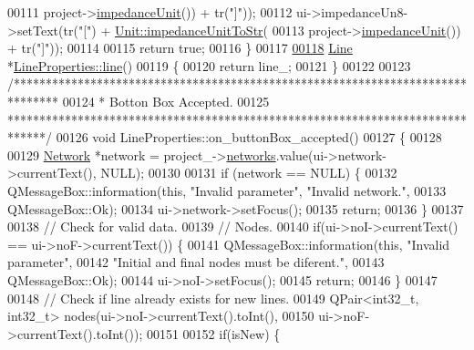 \begin{DoxyCode}
00111                               project->\hyperlink{class_project_ad0725b9aa4445dd6d21d4e15df482d3b}{impedanceUnit}()) + tr(\textcolor{stringliteral}{"]"}));
00112   ui->impedanceUn8->setText(tr(\textcolor{stringliteral}{"["}) + \hyperlink{class_unit_ae3ca20f4b6530f04ca6aa138ec0fa7d2}{Unit::impedanceUnitToStr}(
00113                               project->\hyperlink{class_project_ad0725b9aa4445dd6d21d4e15df482d3b}{impedanceUnit}()) + tr(\textcolor{stringliteral}{"]"}));
00114 
00115   \textcolor{keywordflow}{return} \textcolor{keyword}{true};
00116 \}
00117 
\hypertarget{lineproperties_8cpp_source_l00118}{}\hyperlink{class_line_properties_ae99691d680b4df7bac3419b5588bd777}{00118} \hyperlink{class_line}{Line} *\hyperlink{class_line_properties_ae99691d680b4df7bac3419b5588bd777}{LineProperties::line}()
00119 \{
00120   \textcolor{keywordflow}{return} line\_;
00121 \}
00122 
00123 \textcolor{comment}{/*******************************************************************************}
00124 \textcolor{comment}{ * Botton Box Accepted.}
00125 \textcolor{comment}{ ******************************************************************************/}
00126 \textcolor{keywordtype}{void} LineProperties::on\_buttonBox\_accepted()
00127 \{
00128 
00129   \hyperlink{class_network}{Network} *network = project\_->\hyperlink{class_project_aa98126154cab59769a431668e6f17daf}{networks}.value(ui->network->currentText(), NULL);
00130 
00131   \textcolor{keywordflow}{if} (network == NULL) \{
00132     QMessageBox::information(\textcolor{keyword}{this}, \textcolor{stringliteral}{"Invalid parameter"}, \textcolor{stringliteral}{"Invalid network."},
00133                              QMessageBox::Ok);
00134     ui->network->setFocus();
00135     \textcolor{keywordflow}{return};
00136   \}
00137 
00138   \textcolor{comment}{// Check for valid data.}
00139   \textcolor{comment}{// Nodes.}
00140   \textcolor{keywordflow}{if}(ui->noI->currentText() == ui->noF->currentText()) \{
00141     QMessageBox::information(\textcolor{keyword}{this}, \textcolor{stringliteral}{"Invalid parameter"},
00142                              \textcolor{stringliteral}{"Initial and final nodes must be diferent."},
00143                              QMessageBox::Ok);
00144     ui->noI->setFocus();
00145     \textcolor{keywordflow}{return};
00146   \}
00147 
00148   \textcolor{comment}{// Check if line already exists for new lines.}
00149   QPair<int32\_t, int32\_t> nodes(ui->noI->currentText().toInt(),
00150                                 ui->noF->currentText().toInt());
00151 
00152   \textcolor{keywordflow}{if}(isNew) \{

\end{DoxyCode}
